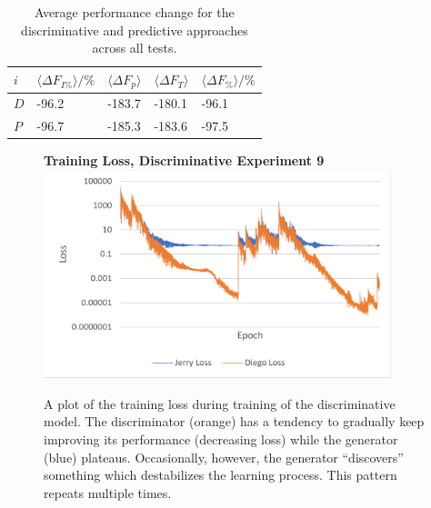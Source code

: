 \documentclass[12pt, titlepage]{report}
\theoremstyle{definition}
\begin{document}
\begin{table}
    \begin{tabularx}{\textwidth}{lXXXX} \toprule
    {$i$}     & {$\langle \Delta F_{I\%} \rangle / \%$}	& {$\langle \Delta F_p \rangle$} 	& {$\langle \Delta F_T \rangle$} 	& {$\langle \Delta F_{\%} \rangle / \%$} \\ \midrule
    $D$ & -96.2 						& -183.7					& 	-180.1	  					& -96.1 \\ \midrule
    $P$ & -96.7  						& -185.3					& -183.6						& -97.5 \\ \bottomrule
\end{tabularx}
\caption[Average performance change across all experiments]{Average performance change for the discriminative and predictive approaches across all tests.}
\label{table:avg_result}
\end{table}

\begin{figure}[H]
    \centering
    \textbf{Training Loss, Discriminative Experiment 9}
    \includegraphics[width=0.9\textwidth]{img/discgan_loss.png}\\
    \caption[Training loss, discriminative experiment 9]{A plot of the training loss during training of the discriminative model. The discriminator (orange) has a tendency to gradually keep improving its performance (decreasing loss) while the generator (blue) plateaus. Occasionally, however, the generator ``discovers'' something which destabilizes the learning process. This pattern repeats multiple times.}
    \label{figure:loss_discgan}
\end{figure}
\end{document}
